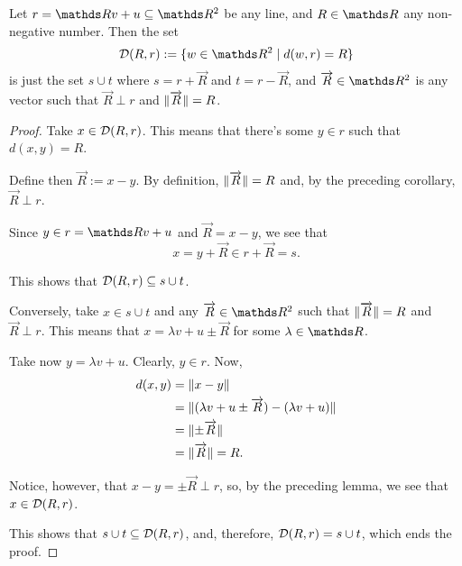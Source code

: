 \begin{lemma}\label{lem:locus fixed distance from a line}
	Let $r=\R v+u\subseteq \R^2$ be any line, and $R\in \R$ any non-negative number. Then the set 
	\[\mc D(R,r):=\{w\in \R^2\mid d(w,r)=R\}\]is just the set $s\cup t$ where $s=r+\overrightarrow{R}$ and $t=r-\overrightarrow{R}$, and $\overrightarrow{R}\in \R^2$ is any vector such that $\overrightarrow{R}\perp r$ and $\lVert\overrightarrow{R}\rVert=R$.
\end{lemma}
\begin{proof}
	Take $x\in \mathcal D(R,r)$. This means that there's some $y\in r$ such that $d(x,y)=R$.
	
	Define then $\overrightarrow{R}:=x-y$. By definition, $\lVert\overrightarrow{R}\rVert=R$ and, by the preceding corollary, $\overrightarrow{R}\perp r$.
	
	Since $y\in r=\R v+u$ and $\overrightarrow{R}=x-y$, we see that $$x=y+\overrightarrow{R}\in r+\overrightarrow{R}=s.$$
	
	This shows that $\mathcal D(R,r)\subseteq s\cup t$.
	
	\bigskip
	Conversely, take $x\in s\cup t$ and any $\overrightarrow{R}\in\R^2$ such that $\lVert\overrightarrow{R}\rVert=R$ and $\overrightarrow{R}\perp r$. This means that $x=\lambda v+u\pm\overrightarrow{R}$ for some $\lambda\in \R$.
	
	Take now $y=\lambda v+u$. Clearly, $y\in r$. Now,
	\begin{align*}
		d(x,y)&=\lVert x-y\rVert\\
		&=\lVert(\lambda v+u\pm\overrightarrow{R})-(\lambda v+u)\rVert\\
		&=\lVert\pm\overrightarrow{R}\rVert\\
		&=\lVert\overrightarrow{R}\rVert=R.
	\end{align*}
	
	Notice, however, that $x-y=\pm\overrightarrow{R}\perp r$, so, by the preceding lemma, we see that $x\in \mathcal D(R,r)$.
	
	This shows that $s\cup t\subseteq\mathcal D(R,r)$, and, therefore, $\mathcal D(R,r)=s\cup t$, which ends the proof.
\end{proof}

